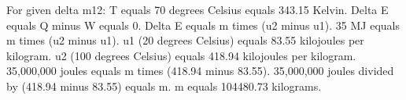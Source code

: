 For given delta m12:  
T equals 70 degrees Celsius equals 343.15 Kelvin.  
Delta E equals Q minus W equals 0.  
Delta E equals m times (u2 minus u1).  
35 MJ equals m times (u2 minus u1).  
u1 (20 degrees Celsius) equals 83.55 kilojoules per kilogram.  
u2 (100 degrees Celsius) equals 418.94 kilojoules per kilogram.  
35,000,000 joules equals m times (418.94 minus 83.55).  
35,000,000 joules divided by (418.94 minus 83.55) equals m.  
m equals 104480.73 kilograms.